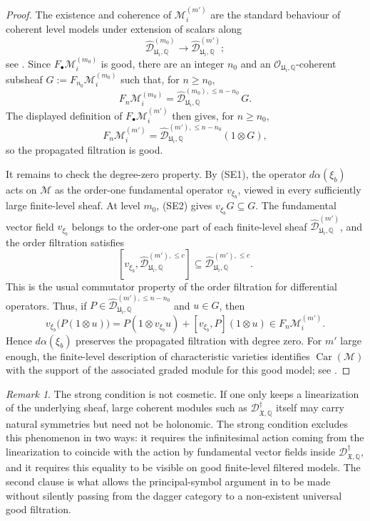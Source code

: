\documentclass[11pt]{amsart}
\theoremstyle{plain}
\theoremstyle{definition}
\theoremstyle{remark}
\newtheorem{remark}{Remark}[section]
\newcommand{\Car}{\operatorname{Car}}
\begin{document}
\begin{proof}
The existence and coherence of \(\mathcal M_i^{(m')}\) are the standard
behaviour of coherent level models under extension of scalars along
\[
  \widehat{\mathscr D}^{(m_0)}_{\mathfrak U_i,\mathbb Q}
  \longrightarrow
  \widehat{\mathscr D}^{(m')}_{\mathfrak U_i,\mathbb Q};
\]
see \cite[5.3.2--5.3.4]{BerthelotIntro}. Since
\(F_\bullet\mathcal M_i^{(m_0)}\) is good, there are an integer \(n_0\) and an
\(\mathcal O_{\mathfrak U_i,\mathbb Q}\)-coherent subsheaf
\(G:=F_{n_0}\mathcal M_i^{(m_0)}\) such that, for \(n\ge n_0\),
\[
  F_n\mathcal M_i^{(m_0)}
  =
  \widehat{\mathscr D}^{(m_0),\le n-n_0}_{\mathfrak U_i,\mathbb Q}\,G .
\]
The displayed definition of \(F_\bullet\mathcal M_i^{(m')}\) then gives, for
\(n\ge n_0\),
\[
  F_n\mathcal M_i^{(m')}
  =
  \widehat{\mathscr D}^{(m'),\le n-n_0}_{\mathfrak U_i,\mathbb Q}
  (1\otimes G),
\]
so the propagated filtration is good.

It remains to check the degree-zero property. By \textup{(SE1)}, the operator
\(d\alpha(\xi_b)\) acts on \(\mathcal M\) as the order-one fundamental
operator \(v_{\xi_b}\), viewed in every sufficiently large finite-level sheaf.
At level \(m_0\), \textup{(SE2)} gives \(v_{\xi_b}G\subseteq G\). The
fundamental vector field \(v_{\xi_b}\) belongs to the order-one part of each
finite-level sheaf
\(\widehat{\mathscr D}^{(m')}_{\mathfrak U_i,\mathbb Q}\), and the order
filtration satisfies
\[
  [v_{\xi_b},
  \widehat{\mathscr D}^{(m'),\le c}_{\mathfrak U_i,\mathbb Q}]
  \subseteq
  \widehat{\mathscr D}^{(m'),\le c}_{\mathfrak U_i,\mathbb Q}.
\]
This is the usual commutator property of the order filtration for differential
operators. Thus, if
\(P\in \widehat{\mathscr D}^{(m'),\le n-n_0}_{\mathfrak U_i,\mathbb Q}\) and
\(u\in G\), then
\[
  v_{\xi_b}\bigl(P(1\otimes u)\bigr)
  =
  P(1\otimes v_{\xi_b}u)+[v_{\xi_b},P](1\otimes u)
  \in
  F_n\mathcal M_i^{(m')}.
\]
Hence \(d\alpha(\xi_b)\) preserves the propagated filtration with degree zero.
For \(m'\) large enough, the finite-level description of characteristic
varieties identifies
\(\Car(\mathcal M)\) with the support of the associated graded module for this
good model; see \cite[5.3.2--5.3.4]{BerthelotIntro}.
\end{proof}



\begin{remark}
\label{rem:strong-condition-not-cosmetic}
The strong condition is not cosmetic. If one only keeps a linearization of the
underlying sheaf, large coherent modules such as
\(\mathscr D^\dagger_{\mathfrak X,\mathbb Q}\) itself may carry natural
symmetries but need not be holonomic. The strong condition excludes this
phenomenon in two ways: it requires the infinitesimal action coming from the
linearization to coincide with the action by fundamental vector fields inside
\(\mathscr D^\dagger_{\mathfrak X,\mathbb Q}\), and it requires this equality to
be visible on good finite-level filtered models.  The second clause is what
allows the principal-symbol argument in  to be made
without silently passing from the dagger category to a non-existent universal
good filtration.
\end{remark}
\end{document}
